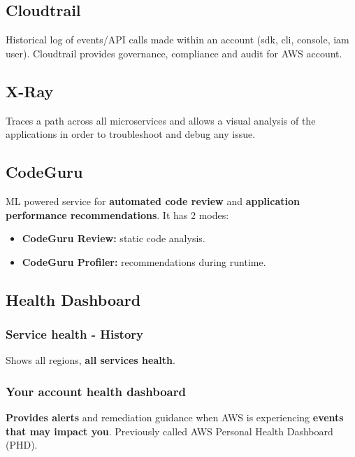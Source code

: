 \subsection{Cloudtrail}\label{subsec:cloudtrail}
Historical log of events/API calls made within an account (sdk, cli, console, iam user).
Cloudtrail provides governance, compliance and audit for AWS account.

\subsection{X-Ray}\label{subsec:x-ray}
Traces a path across all microservices and allows a visual analysis of the applications in order to
troubleshoot and debug any issue.

\subsection{CodeGuru}\label{subsec:codeguru}
ML powered service for \textbf{automated code review} and \textbf{application performance recommendations}.
It has 2 modes:

\begin{itemize}
    \item{\textbf{CodeGuru Review:} static code analysis.}
    \item{\textbf{CodeGuru Profiler:} recommendations during runtime.}
\end{itemize}

\subsection{Health Dashboard}\label{subsec:health-dashboard}

\subsubsection{Service health - History}
Shows all regions, \textbf{all services health}\@.

\subsubsection{Your account health dashboard}
\textbf{Provides alerts} and remediation guidance when AWS is experiencing \textbf{events that may impact you}\@.
Previously called AWS Personal Health Dashboard (PHD)\@.
